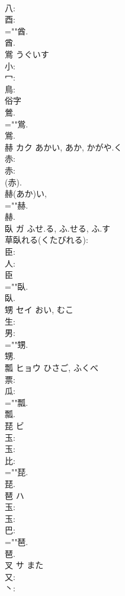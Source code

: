 \documentclass[8pt]{extreport}
\begin{document}
\begin{CJK}{UTF8}{min}
\\	八: 
\\	酉: 
\\	=""酋.
\\	酋.
\\	鴬		うぐいす				
\\	小: 
\\	冖: 
\\	鳥: 
\\	俗字 
\\	鶯. 
\\	=""鴬.
\\	鴬.
\\	赫	カク	あかい, あか, かがや.く		
\\	赤: 
\\	赤: 
\\	(赤). 
\\	赫(あか)い, 
\\	=""赫.
\\	赫.
\\	臥	ガ	ふせ.る, ふ.せる, ふ.す		
\\	草臥れる(くたびれる): 
\\	臣: 
\\	人: 
\\	臣 
\\	=""臥.
\\	臥.
\\	甥	セイ	おい, むこ		
\\	生: 
\\	男: 
\\	=""甥.
\\	甥.
\\	瓢	ヒョウ	ひさご, ふくべ		
\\	票: 
\\	瓜: 
\\	=""瓢.
\\	瓢.
\\	琵	ビ			
\\	玉: 
\\	玉: 
\\	比: 
\\	=""琵.
\\	琵.
\\	琶	ハ			
\\	玉: 
\\	玉: 
\\	巴: 
\\	=""琶.
\\	琶.
\\	叉	サ	また		
\\	又: 
\\	丶: 

\end{CJK}
\end{document}
